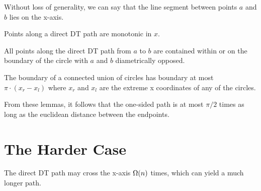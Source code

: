 \documentclass{tufte-handout}
\begin{document}
Without loss of generality, we can say that the line segment between
points $a$ and $b$ lies on the x-axis.

\begin{Lemma}

  Points along a direct DT path are monotonic in $x$.

\end{Lemma}

\begin{Lemma}

  All points along the direct DT path from $a$ to $b$ are contained
  within or on the boundary of the circle with $a$ and $b$
  diametrically opposed.
  
\end{Lemma}

\begin{Lemma}

  The boundary of a connected union of circles has boundary at most
  $\pi \cdot (x_r - x_l)$ where $x_r$ and $x_l$ are the extreme x
  coordinates of any of the circles.
  
\end{Lemma}

From these lemmas, it follows that the one-sided path is at most
$\pi/2$ times as long as the euclidean distance between the endpoints.

\section{The Harder Case}

The direct DT path may cross the x-axis $\Omega\!\left(n\right)$ times,
which can yield a much longer path.
\end{document}
